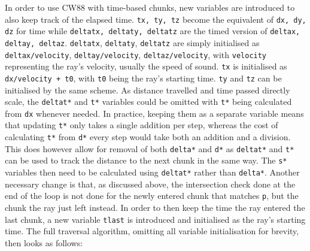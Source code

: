 In order to use CW88 with time-based chunks,
new variables are introduced to also keep track of the elapsed time.
\verb|tx, ty, tz| become the equivalent of \verb|dx, dy, dz| for time
while \verb|deltatx, deltaty, deltatz| are the timed version of \verb|deltax, deltay, deltaz|.
\newline
\verb|deltatx|, \verb|deltaty|, \verb|deltatz| are simply initialised as \verb|deltax/velocity|, \verb|deltay/velocity|, \verb|deltaz/velocity|,
with \verb|velocity| representing the ray's velocity, usually the speed of sound.
\verb|tx| is initialised as \verb|dx/velocity + t0|, with \verb|t0| being the ray's starting time.
\verb|ty| and \verb|tz| can be initialised by the same scheme.
\newline
As distance travelled and time passed directly scale,
the \verb|deltat*| and \verb|t*| variables could be omitted with \verb|t*| being calculated from \verb|dx| whenever needed.
In practice, keeping them as a separate variable means that updating \verb|t*| only takes a single addition per step,
whereas the cost of calculating \verb|t*| from \verb|d*| every step would take both an addition and a division.
\newline
This does however allow for removal of both \verb|delta*| and \verb|d*|
as \verb|deltat*| and \verb|t*| can be used to track the distance to the next chunk in the same way.
The \verb|s*| variables then need to be calculated using \verb|deltat*| rather than \verb|delta*|.
\newline
Another necessary change is that, as discussed above,
the intersection check done at the end of the loop is not done for the newly entered chunk that matches \verb|p|,
but the chunk the ray just left instead.
In order to then keep the time the ray entered the last chunk,
a new variable \verb|tlast| is introduced and initialised as the ray's starting time.
\newline
The full traversal algorithm, omitting all variable initialisation for brevity, then looks as follows:

